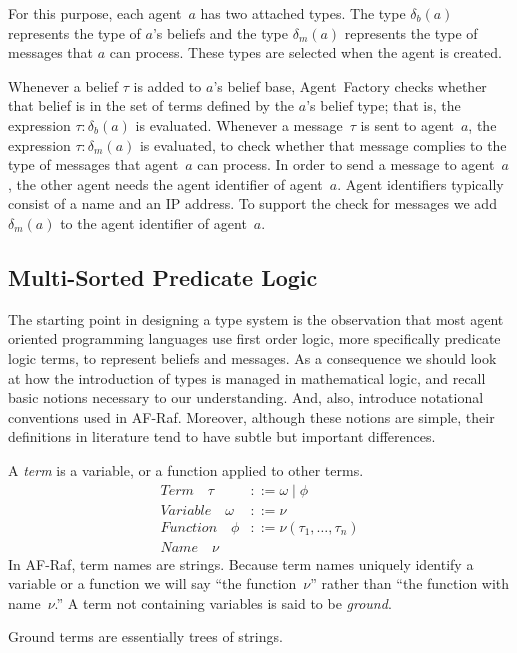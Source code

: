 \documentclass[a4paper,12pt,oneside,fleqn]{book} %
\begin{document}
For this purpose, each agent~$a$ has two attached types. The type $\delta_b(a)$
represents the type of $a$'s beliefs and the type $\delta_m(a)$ represents the
type of messages that $a$ can process. These types are selected when the agent
is created.

Whenever a belief $\tau$ is added to $a$'s belief base, Agent~Factory checks
whether that belief is in the set of terms defined by the $a$'s belief type;
that is, the expression $\tau:\delta_b(a)$ is evaluated.  Whenever a
message~$\tau$ is sent to agent~$a$, the expression $\tau:\delta_m(a)$ is
evaluated, to check whether that message complies to the type of messages that
agent~$a$ can process. In order to send a message to agent~$a$, the other agent
needs the agent identifier of agent~$a$. Agent identifiers typically consist of
a name and an IP address. To support the check for messages we add
$\delta_m(a)$ to the agent identifier of agent~$a$.

\subsection{Multi-Sorted Predicate Logic} \label{sec:multi-sorted} %

The starting point in designing a type system is the observation that most
agent oriented programming languages use first order logic, more
specifically predicate logic terms, to represent beliefs and messages. As a
consequence we should look at how the introduction of types is managed in
mathematical logic, and recall basic notions necessary to our
understanding. And, also, introduce notational conventions used in AF-Raf.
Moreover, although these notions are simple, their definitions in
literature tend to have subtle but important differences.

A \emph{term} is a variable, or a function applied to other terms.
\begin{align}
\mathit{Term}\quad\tau &::= \omega \mid \phi \\
\mathit{Variable}\quad\omega &::= \nu \\
\mathit{Function}\quad\phi &::= \nu(\tau_1,\ldots,\tau_n) \\
\mathit{Name}\quad\nu
\end{align}
In AF-Raf, term names are strings.  Because term names uniquely identify a
variable or a function we will say ``the function~$\nu$'' rather than ``the
function with name~$\nu$.'' A term not containing variables is said to be
\emph{ground}.

\begin{remark}
Ground terms are essentially trees of strings.
\end{remark}
\end{document}

